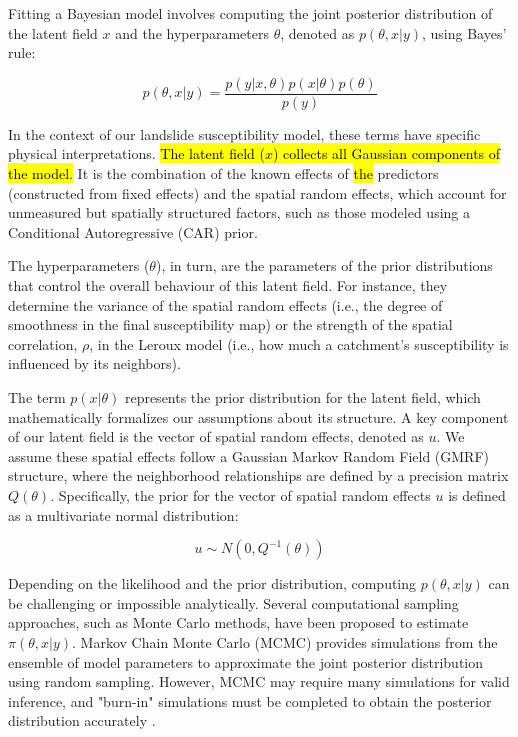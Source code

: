 \documentclass[journal abbreviation, manuscript]{copernicus}
\newcommand{\hlE}[1]{{\sethlcolor{edcyan}\hl{#1}}}
\begin{document}
Fitting a Bayesian model involves computing the joint posterior distribution of the latent field $x$ and the hyperparameters $\theta$, denoted as $p(\theta, x|y)$, using Bayes' rule:

\begin{equation}
p(\theta,x | y) = \frac{p(y | x,\theta) p(x | \theta) p(\theta)}{p(y)}
\end{equation}

In the context of our landslide susceptibility model, these terms have specific physical interpretations. \hlE{The latent field ($x$) collects all Gaussian components of the model.} It is the combination of the known effects of \hlE{the} predictors (constructed from fixed effects) and the spatial random effects, which account for unmeasured but spatially structured factors, such as those modeled using a Conditional Autoregressive (CAR) prior.

The hyperparameters ($\theta$), in turn, are the parameters of the prior distributions that control the overall behaviour of this latent field. For instance, they determine the variance of the spatial random effects (i.e., the degree of smoothness in the final susceptibility map) or the strength of the spatial correlation, $\rho$, in the Leroux model (i.e., how much a catchment's susceptibility is influenced by its neighbors).

The term $p(x|\theta)$ represents the prior distribution for the latent field, which mathematically formalizes our assumptions about its structure. A key component of our latent field is the vector of spatial random effects, denoted as $u$. We assume these spatial effects follow a Gaussian Markov Random Field (GMRF) structure, where the neighborhood relationships are defined by a precision matrix $Q(\theta)$. Specifically, the prior for the vector of spatial random effects $u$ is defined as a multivariate normal distribution:

\begin{equation}
u \sim N(0,Q^{-1}(\theta))
\end{equation}

Depending on the likelihood and the prior distribution, computing $p(\theta, x|y)$ can be challenging \citep{gallagher2009markov} or impossible analytically. Several computational sampling approaches, such as Monte Carlo methods, have been proposed to estimate $\pi(\theta, x|y)$. Markov Chain Monte Carlo (MCMC) provides simulations from the ensemble of model parameters \citep{brooks1998markov} to approximate the joint posterior distribution using random sampling. However, MCMC may require many simulations for valid inference, and "burn-in" simulations must be completed to obtain the posterior distribution accurately \citep{jones2022markov}.
\end{document}
